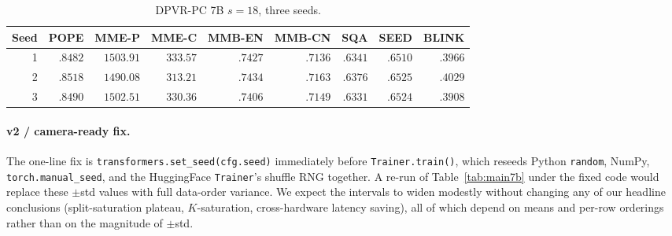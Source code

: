 \documentclass[a4paper,fleqn,review]{cas-sc}
\newcommand{\dpvrpc}{DPVR-PC}
\begin{document}
\begin{table}[h]
\centering
\caption{\dpvrpc{} 7B $s = 18$, three seeds.}
\label{tab:per-seed-pc}
\footnotesize
\setlength{\tabcolsep}{4pt}
\begin{tabular}{rrrrrrrrr}
\toprule
Seed & POPE & MME-P & MME-C & MMB-EN & MMB-CN & SQA & SEED & BLINK \\
\midrule
1 & $.8482$ & $1503.91$ & $333.57$ & $.7427$ & $.7136$ & $.6341$ & $.6510$ & $.3966$ \\
2 & $.8518$ & $1490.08$ & $313.21$ & $.7434$ & $.7163$ & $.6376$ & $.6525$ & $.4029$ \\
3 & $.8490$ & $1502.51$ & $330.36$ & $.7406$ & $.7149$ & $.6331$ & $.6524$ & $.3908$ \\
\bottomrule
\end{tabular}
\end{table}

\paragraph{v2 / camera-ready fix.} The one-line fix is
\texttt{transformers.\allowbreak set\_seed(cfg.seed)} immediately before
\texttt{Trainer.train()}, which reseeds Python \texttt{random},
NumPy, \texttt{torch.manual\_seed}, and the HuggingFace
\texttt{Trainer}'s shuffle RNG together. A re-run of
Table~\ref{tab:main7b} under the fixed code would replace these
$\pm$std values with full data-order variance. We expect the
intervals to widen modestly without changing any of our headline
conclusions (split-saturation plateau, $K$-saturation, cross-hardware
latency saving), all of which depend on means and per-row
orderings rather than on the magnitude of $\pm$std.
\end{document}
